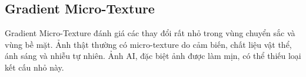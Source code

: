 \subsection{Gradient Micro-Texture}
Gradient Micro-Texture đánh giá các thay đổi rất nhỏ trong vùng chuyển sắc và vùng bề mặt. Ảnh thật thường có micro-texture do cảm biến, chất liệu vật thể, ánh sáng và nhiễu tự nhiên. Ảnh AI, đặc biệt ảnh được làm mịn, có thể thiếu loại kết cấu nhỏ này.
